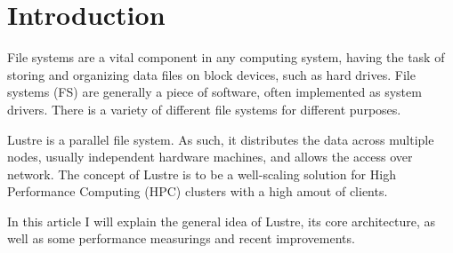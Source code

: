 \section{Introduction}

File systems are a vital component in any computing system, having the task
of storing and organizing data files on block devices, such as hard drives.
File systems (FS) are generally a piece of software, often implemented as
system drivers. There is a variety of different file systems for different
purposes.

Lustre is a parallel file system. As such, it distributes the data across
multiple nodes, usually independent hardware machines, and allows the access
over network. The concept of Lustre is to be a well-scaling solution for
High Performance Computing (HPC) clusters with a high amout of clients.

In this article I will explain the general idea of Lustre, its core
architecture, as well as some performance measurings and recent improvements.

\vfill

\renewcommand\cftparskip{-1pt}
\tableofcontents
